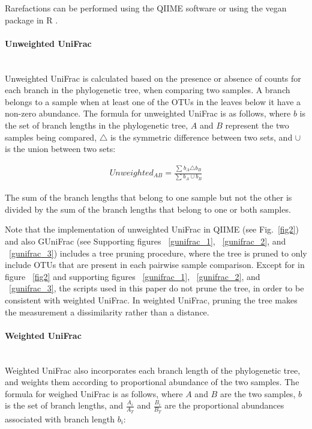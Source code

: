 \documentclass[10pt,letterpaper]{article}
\begin{document}
Rarefactions can be performed using the QIIME software \cite{caporaso2010qiime} or using the vegan package in R \cite{oksanen2007vegan}.

\paragraph{Unweighted UniFrac}\mbox{}\\
Unweighted UniFrac is calculated based on the presence or absence of counts for each branch in the phylogenetic tree, when comparing two samples. A branch belongs to a sample when at least one of the OTUs in the leaves below it have a non-zero abundance. The formula for unweighted UniFrac is as follows, where $b$ is the set of branch lengths in the phylogenetic tree, $A$ and $B$ represent the two samples being compared, $\triangle$ is the symmetric difference between two sets, and $\cup$ is the union between two sets:

\begin{align*}
Unweighted_{AB} = \frac{\sum_{}{} b_{A} \triangle b_{B}}{\sum_{}{} b_{A} \cup b_{B}}
\end{align*}

The sum of the branch lengths that belong to one sample but not the other is divided by the sum of the branch lengths that belong to one or both samples.

Note that the implementation of unweighted UniFrac in QIIME (see Fig.~\ref{fig2}) and also GUniFrac (see Supporting figures ~\ref{gunifrac_1}, ~\ref{gunifrac_2}, and ~\ref{gunifrac_3}) includes a tree pruning procedure, where the tree is pruned to only include OTUs that are present in each pairwise sample comparison. Except for in figure ~\ref{fig2} and supporting figures ~\ref{gunifrac_1}, ~\ref{gunifrac_2}, and ~\ref{gunifrac_3}, the scripts used in this paper do not prune the tree, in order to be consistent with weighted UniFrac. In weighted UniFrac, pruning the tree makes the measurement a dissimilarity rather than a distance.

\paragraph{Weighted UniFrac}\mbox{}\\
Weighted UniFrac \cite{lozupone2007quantitative} also incorporates each branch length of the phylogenetic tree, and weights them according to proportional abundance of the two samples. The formula for weighed UniFrac is as follows, where $A$ and $B$ are the two samples, $b$ is the set of branch lengths, and $\frac{A_{i}}{A_{T}}$ and $\frac{B_{i}}{B_{T}}$ are the proportional abundances associated with branch length $b_{i}$:
\end{document}
